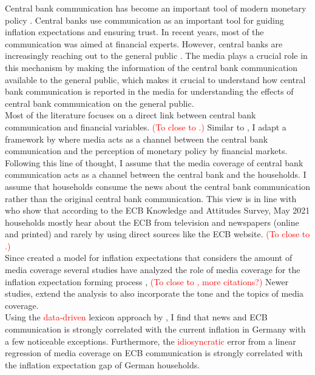 \documentclass[review]{elsarticle}
\begin{document}
Central bank communication has become an important tool of modern monetary policy \citep{Blinderetal2017}. Central banks use communication as an important tool for guiding inflation expectations and ensuring trust. In recent years, most of the communication was aimed at financial experts. However, central banks are increasingly reaching out to the general public \citep{Blinderetal2022}. The media plays a crucial role in this mechanism by making the information of the central bank communication available to the general public, which makes it crucial to understand how central bank communication is reported in the media for understanding the effects of central bank communication on the general public.
\\
Most of the literature focuses on a direct link between central bank communication and financial variables. \textcolor{red}{(To close to \cite{Picaultetal2022}.)} Similar to \cite{Picaultetal2022}, I adapt a framework by \cite{HayoNeuenkirch2015} where media acts as a channel between the central bank communication and the perception of monetary policy by financial markets. 
Following this line of thought, I assume that the media coverage of central bank communication acts as a channel between the central bank and the households. I assume that households consume the news about the central bank communication rather than the original central bank communication. This view is in line with \cite{Gardt2022} who show that according to the ECB Knowledge and Attitudes Survey, May 2021 households mostly hear about the ECB from television and newspapers (online and printed) and rarely by using direct sources like the ECB website. \textcolor{red}{(To close to \cite{Blinderetal2022}.)}
\\
Since \cite{Carroll2003} created a model for inflation expectations that considers the amount of media coverage several studies have analyzed the role of media coverage for the inflation expectation forming process \cite{Ehrmann2017},  \textcolor{red}{(To close to \cite{Larsen2021}, more citations?)}
Newer studies, extend the analysis to also incorporate the tone \citep{LamlaLein2014} and the topics \citep{Larsen2021} of media coverage. 
\\
Using the \textcolor{red}{data-driven} lexicon approach by \cite{PicaultRenault2017}, I find that news and ECB communication is strongly correlated with the current inflation in Germany with a few noticeable exceptions. Furthermore, the \textcolor{red}{idiosyncratic} error from a linear regression of media coverage on ECB communication is strongly correlated with the inflation expectation gap of German households.
\end{document}

